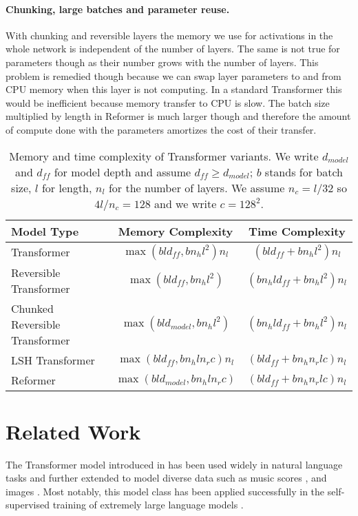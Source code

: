 \paragraph{Chunking, large batches and parameter reuse.}
With chunking and reversible layers the memory we use for activations
in the whole network is independent of the number of layers. The same is
not true for parameters though as their number grows with the number of layers. This problem is remedied though because we can swap layer
parameters to and from CPU memory when this layer is not computing.
In a standard Transformer this would be inefficient because memory
transfer to CPU is slow. The batch size multiplied by length in Reformer
is much larger though and therefore the amount of compute done with the parameters amortizes the cost of their transfer.

\begin{table}
\caption{Memory and time complexity of Transformer variants.
  We write $d_{model}$ and $d_{ff}$ for model depth and assume $d_{ff} \geq d_{model}$; $b$ stands for batch size, $l$ for length, $n_l$ for the number of layers.
  We assume $n_{c} = l/32$ so $4l/n_{c} = 128$ and we write $c = 128^2$.}
\label{tab:tcomplexity}
\begin{center}
\begin{tabular}{lcc}
Model Type & Memory Complexity & Time Complexity  \\
\hline
Transformer & $\max(bld_{ff}, bn_hl^2)n_l$ & $(bld_{ff} + bn_hl^2)n_l$ \\
Reversible Transformer & $\max(bld_{ff}, bn_hl^2)$ & $(bn_hld_{ff} + bn_hl^2)n_l$ \\
Chunked Reversible Transformer & $\max(bld_{model}, bn_hl^2)$ & $(bn_hld_{ff} + bn_hl^2)n_l$ \\
LSH Transformer & $\max(bld_{ff}, bn_hln_rc)n_l$ & $(bld_{ff} + bn_hn_rlc)n_l$ \\
Reformer & $\max(bld_{model}, bn_hln_rc)$ & $(bld_{ff} + bn_hn_rlc)n_l$ \\

\end{tabular}
\end{center}
\end{table}

\section{Related Work} \label{sec:relwork}

The Transformer model introduced in \citep{transformer} has been used
widely in natural language tasks and further extended to model diverse data such as music scores \citep{huang2018music}, 
and images \citep{parmar2018imagetransformer, ramachandran2019attentionimage}.  Most notably, this model class 
has been applied successfully in the self-supervised training of extremely large language models
\citep{devlin2018BERT, radford2019GPT2}.

